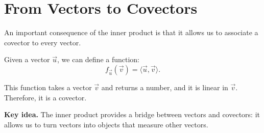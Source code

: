 \documentclass[11pt,openany]{book}
\theoremstyle{definition}
\begin{document}
\medskip

\section{From Vectors to Covectors}

An important consequence of the inner product is that it allows us to associate a 
covector to every vector.

\medskip

Given a vector $\vec{u}$, we can define a function:
\[
f_{\vec{u}}(\vec{v}) = \langle \vec{u}, \vec{v} \rangle.
\]

\medskip

This function takes a vector $\vec{v}$ and returns a number, and it is linear in 
$\vec{v}$. Therefore, it is a covector.

\medskip

\textbf{Key idea.} The inner product provides a bridge between vectors and 
covectors: it allows us to turn vectors into objects that measure other vectors.
\end{document}
